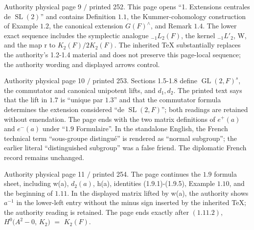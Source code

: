 \documentclass[10pt,a4paper]{article}
\begin{document}
\clearpage
{}
\label{d035-physical-009}
\par Authority physical page 9 $/$ printed 252. This page opens ``1. Extensions centrales de $\operatorname{SL}(2)$'' and contains Definition $1.1$, the Kummer-cohomology construction of Example $1.2$, the canonical extension $G(F)^\wedge{}$, and Remark $1.4$. The lower exact sequence includes the symplectic analogue $_{-1}L_2(F)$, the kernel $_{-1}L'_2$, W, and the map r to $K_2(F)/2K_2(F)$. The inherited TeX substantially replaces the authority's 1.2-1.4 material and does not preserve this page-local sequence; the authority wording and displayed arrows control.\par

\clearpage
{}
\label{d035-physical-010}
\par Authority physical page 10 $/$ printed 253. Sections 1.5-1.8 define $\operatorname{GL}(2,F)^s$, the commutator and canonical unipotent lifts, and $d_1,d_2$. The printed text says that the lift in $1.7$ is ``unique par $1.3$'' and that the commutator formula determines the extension considered ``de $\operatorname{SL}(2,F)$''; both readings are retained without emendation. The page ends with the two matrix definitions of $e^+(a)$ and $e^-(a)$ under ``$1.9$ Formulaire''. In the standalone English, the French technical term ``sous-groupe distingué'' is rendered as ``normal subgroup''; the earlier literal ``distinguished subgroup'' was a false friend. The diplomatic French record remains unchanged.\par

\clearpage
{}
\label{d035-physical-011}
\par Authority physical page 11 $/$ printed 254. The page continues the $1.9$ formula sheet, including w(a), $d_2(a)$, h(a), identities (1.9.1)-(1.9.5), Example $1.10$, and the beginning of $1.11$. In the displayed matrix lifted by w(a), the authority shows $a^{-1}$ in the lower-left entry without the minus sign inserted by the inherited TeX; the authority reading is retained. The page ends exactly after $(1.11.2)$, $H^0(A^2-{0}$, $K_2)$ $=$ $K_2(F)$.\par
\end{document}
